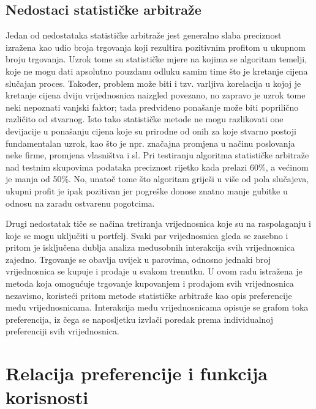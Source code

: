 \documentclass[lmodern, utf8, diplomski, numeric]{fer}
\begin{document}
  \subsection{Nedostaci statističke arbitraže}
  Jedan od nedostataka statističke arbitraže jest generalno slaba preciznost izražena kao udio broja trgovanja koji rezultira pozitivnim profitom u ukupnom broju trgovanja.
  Uzrok tome su statističke mjere na kojima se algoritam temelji, koje ne mogu dati apsolutno pouzdanu odluku samim time što je kretanje cijena slučajan proces.
  Također, problem može biti i tzv. varljiva korelacija u kojoj je kretanje cijena dviju vrijednosnica naizgled povezano, no zapravo je uzrok tome neki nepoznati vanjski faktor; tada predviđeno ponašanje može biti poprilično različito od stvarnog.
  Isto tako statističke metode ne mogu razlikovati one devijacije u ponašanju cijena koje su prirodne od onih za koje stvarno postoji fundamentalan uzrok, kao što je npr. značajna promjena u načinu poslovanja neke firme, promjena vlasništva i sl.
  Pri testiranju algoritma statističke arbitraže nad testnim skupovima podataka preciznost rijetko kada prelazi 60\%, a većinom je manja od 50\%.
  No, unatoč tome što algoritam griješi u više od pola slučajeva, ukupni profit je ipak pozitivan jer pogreške donose znatno manje gubitke u odnosu na zaradu ostvarenu pogotcima.
  
  Drugi nedostatak tiče se načina tretiranja vrijednosnica koje su na raspolaganju i koje se mogu uključiti u portfelj.
  Svaki par vrijednosnica gleda se zasebno i pritom je isključena dublja analiza međusobnih interakcija svih vrijednosnica zajedno.
  Trgovanje se obavlja uvijek u parovima, odnosno jednaki broj vrijednosnica se kupuje i prodaje u svakom trenutku.
  U ovom radu istražena je metoda koja omogućuje trgovanje kupovanjem i prodajom svih vrijednosnica nezavisno, koristeći pritom metode statističke arbitraže kao opis preferencije među vrijednosnicama.
  Interakcija među vrijednosnicama opisuje se grafom toka preferencija, iz čega se naposljetku izvlači poredak prema individualnoj preferenciji svih vrijednosnica.
  
  

  \section{Relacija preferencije i funkcija korisnosti}
\end{document}
